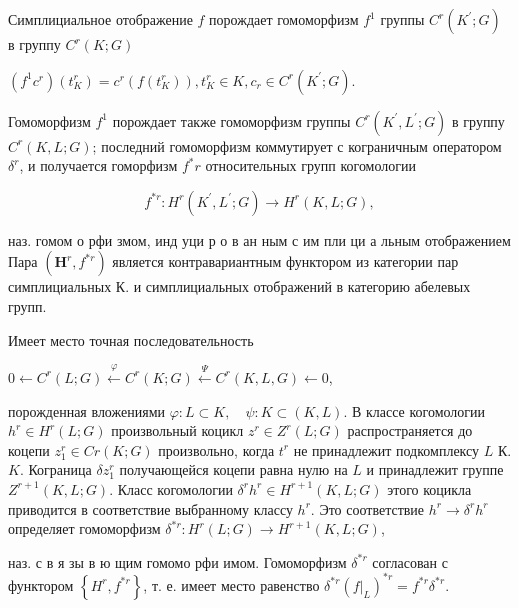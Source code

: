 \documentclass[10pt]{article}
\begin{document}
Симплициальное отображение $f$ порождает гомоморфизм $f^{1}$ группы $C^{r}\left(K^{\prime} ; G\right)$ в группу $C^{r}(K ; G)$



$\left(f^{1} c^{r}\right)\left(t_{K}^{r}\right)=c^{r}\left(f\left(t_{K}^{r}\right)\right), t_{K}^{r} \in K, c_{r} \in C^{r}\left(K^{\prime} ; G\right)$.



Гомоморфизм $f^{1}$ порождает также гомоморфизм группы $C^{r}\left(K^{\prime}, L^{\prime} ; G\right)$ в группу $C^{r}(K, L ; G)$; последний гомоморфизм коммутирует с кограничным оператором $\delta^{r}$, и получается гоморфизм $f^{*} r$ относительных групп когомологии



\[

f^{* r}: H^{r}\left(K^{\prime}, L^{\prime} ; G\right) \rightarrow H^{r}(K, L ; G),

\]



наз. гомом о рфи змом, инд уци р о в ан ным с им пли ци а льным отображением Пара $\left(\boldsymbol{H}^{r}, f^{* r}\right)$ является контравариантным функтором из категории пар симплициальных К. и симплициальных отображений в категорию абелевых групп.



Имеет место точная последовательность



$0 \longleftarrow C^{r}(L ; G) \stackrel{\varphi}{\longleftarrow} C^{r}(K ; G) \stackrel{\Psi}{\longleftarrow} C^{r}(K, L, G) \longleftarrow 0$,



порожденная вложениями $\varphi: L \subset K, \quad \psi: K \subset(K, L)$. В классе когомологии $h^{r} \in H^{r}(L ; G)$ произвольный коцикл $z^{r} \in Z^{r}(L ; G)$ распространяется до коцепи $z_{1}^{r} \in C r(K ; G)$ произвольно, когда $t^{r}$ не принадлежит подкомплексу $L$ К. $K$. Кограница $\delta z_{1}^{r}$ получающейся коцепи равна нулю на $L$ и принадлежит группе $Z^{r+1}(K, L ; G)$. Класс когомологии $\delta^{r} h^{r} \in H^{r+1}(K, L ; G)$ этого коцикла приводится в соответствие выбранному классу $h^{r}$. Это соответствие $h^{r} \rightarrow \delta^{r} h^{r}$ определяет гомоморфизм $\delta^{* r}: H^{r}(L ; G) \rightarrow H^{r+1}(K, L ; G)$,



наз. с в я зы в ю щим гомомо рфи имом. Гомоморфизм $\delta^{* r}$ согласован с функтором $\left\{H^{r}, f^{* r}\right\}$, т. е. имеет место равенство $\delta^{* r}\left(\left.f\right|_{L}\right)^{* r}=f^{* r} \delta^{* r}$.
\end{document}
